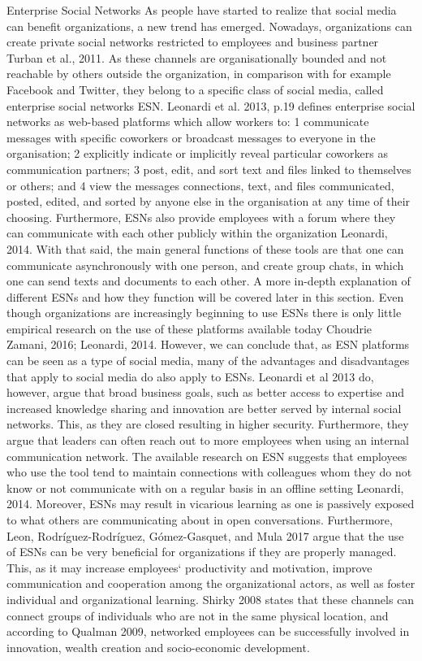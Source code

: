 Enterprise Social Networks
As people have started to realize that social media can benefit organizations, a new trend has emerged. Nowadays, organizations can create private social networks restricted to employees and business partner Turban et al., 2011. As these channels are organisationally bounded and not reachable by others outside the organization, in comparison with for example Facebook and Twitter, they belong to a specific class of social media, called enterprise social networks ESN. Leonardi et al. 2013, p.19 defines enterprise social networks as web-based platforms which allow workers to: 1 communicate messages with specific coworkers or broadcast messages to everyone in the organisation; 2 explicitly indicate or implicitly reveal particular coworkers as communication partners; 3 post, edit, and sort text and files linked to themselves or others; and 4 view the messages connections, text, and files communicated, posted, edited, and sorted by anyone else in the organisation at any time of their choosing. 
Furthermore, ESNs also provide employees with a forum where they can communicate with each other publicly within the organization Leonardi, 2014. With that said, the main general functions of these tools are that one can communicate asynchronously with one person, and create group chats, in which one can send texts and documents to each other. A more in-depth explanation of different ESNs and how they function will be covered later in this section.
Even though organizations are increasingly beginning to use ESNs there is only little empirical research on the use of these platforms available today Choudrie  Zamani, 2016; Leonardi, 2014. However, we can conclude that, as ESN platforms can be seen as a type of social media, many of the advantages and disadvantages that apply to social media do also apply to ESNs. Leonardi et al 2013 do, however, argue that broad business goals, such as better access to expertise and increased knowledge sharing and innovation are better served by internal social networks. This, as they are closed resulting in higher security. Furthermore, they argue that leaders can often reach out to more employees when using an internal communication network.
The available research on ESN suggests that employees who use the tool tend to maintain connections with colleagues whom they do not know or not communicate with on a regular basis in an offline setting Leonardi, 2014. Moreover, ESNs may result in vicarious learning as one is passively exposed to what others are communicating about in open conversations. Furthermore, Leon, Rodríguez-Rodríguez, Gómez-Gasquet, and Mula 2017 argue that the use of ESNs can be very beneficial for organizations if they are properly managed. This, as it may increase employees‘ productivity and motivation, improve communication and cooperation among the organizational actors, as well as foster individual and organizational learning. Shirky 2008 states that these channels can connect groups of individuals who are not in the same physical location, and according to Qualman 2009, networked employees can be successfully involved in innovation, wealth creation and socio-economic development.
